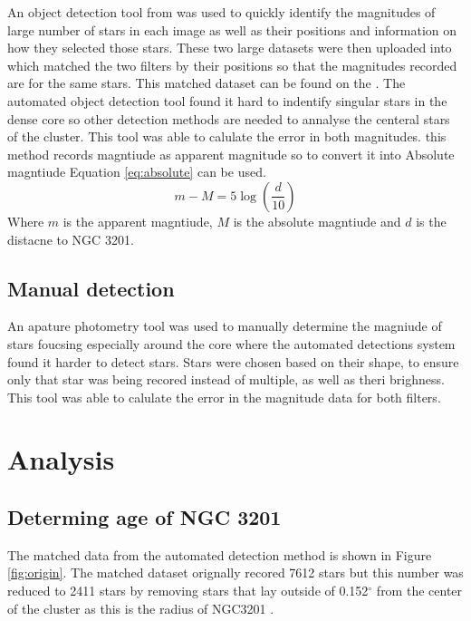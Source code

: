 \documentclass[11pt]{article}
\begin{document}
An object detection tool from \citet{gaia} was used to quickly identify the magnitudes of large number of stars in each image as well as their positions and information on how they selected those stars. These two large datasets were then uploaded into \citet{topcat} which matched the two filters by their positions so that the magnitudes recorded are for the same stars. This matched dataset can be found on the \citet{github}. The automated object detection tool found it hard to indentify singular stars in the dense core so other detection methods are needed to annalyse the centeral stars of the cluster. This tool was able to calulate the error in both magnitudes. this method records magntiude as apparent magnitude so to convert it into Absolute magntiude Equation \ref{eq:absolute} can be used.
\begin{equation}
	m-M = 5 \log \left( \frac{d}{10} \right)
	\label{eq:absolute}
\end{equation}
Where $m$ is the apparent magntiude, $M$ is the absolute magntiude and $d$ is the distacne to NGC 3201.
\subsection{Manual detection}

An apature photometry tool was used to manually determine the magniude of stars foucsing especially around the core where the automated detections system found it harder to detect stars. Stars were chosen based on their shape, to ensure only that star was being recored instead of multiple, as well as theri brighness. This tool was able to calulate the error in the magnitude data for both filters.

\section{Analysis}

\subsection{Determing age of NGC 3201}

The matched data from the automated detection method is shown in Figure \ref{fig:origin}. The matched dataset orignally recored 7612 stars but this number was reduced to 2411 stars by removing stars that lay outside of 0.152$^{\circ}$ from the center of the cluster as this is the radius of NGC3201 \citep{radius}. 
\end{document}
